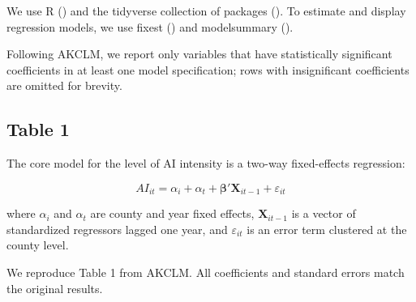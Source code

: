 \documentclass[
]{article}
\begin{document}
We use R () and the
tidyverse collection of packages (). To estimate and display regression models, we use fixest
() and modelsummary
().

Following AKCLM, we report only variables that have statistically
significant coefficients in at least one model specification; rows with
insignificant coefficients are omitted for brevity.

\subsection{Table 1}\label{table-1}

The core model for the level of AI intensity is a two-way fixed-effects
regression:

\[
AI_{it} = \alpha_i + \alpha_t + \boldsymbol{\beta}' \mathbf{X}_{it-1} + \varepsilon_{it} \tag{4}
\]

where \(\alpha_i\) and \(\alpha_t\) are county and year fixed effects,
\(\mathbf{X}_{it-1}\) is a vector of standardized regressors lagged one
year, and \(\varepsilon_{it}\) is an error term clustered at the county
level.

We reproduce Table 1 from AKCLM. All coefficients and standard errors
match the original results.
\end{document}
